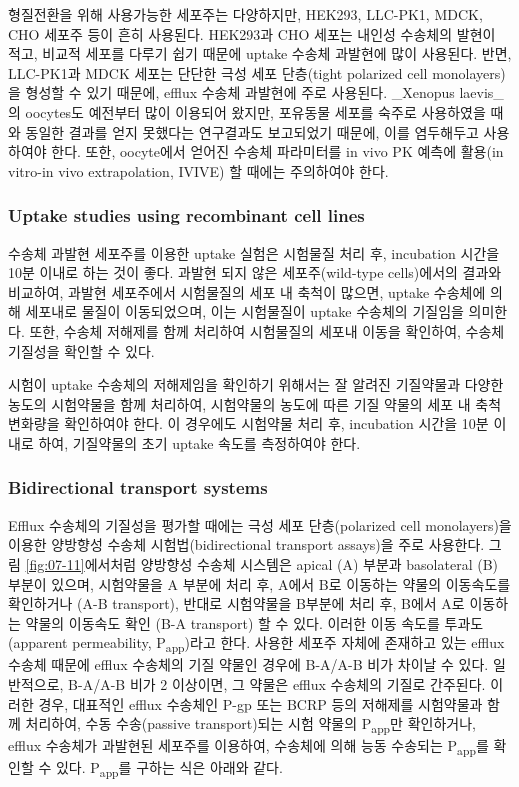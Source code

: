 \documentclass[
  11pt,
  krantz2, a4paper, twoside]{krantz}
\begin{document}
형질전환을 위해 사용가능한 세포주는 다양하지만, HEK293, LLC-PK1, MDCK,
CHO 세포주 등이 흔히 사용된다. HEK293과 CHO 세포는 내인성 수송체의
발현이 적고, 비교적 세포를 다루기 쉽기 때문에 uptake 수송체 과발현에
많이 사용된다. 반면, LLC-PK1과 MDCK 세포는 단단한 극성 세포 단층(tight
polarized cell monolayers)을 형성할 수 있기 때문에, efflux 수송체
과발현에 주로 사용된다. \_Xenopus laevis\_의 oocytes도 예전부터 많이
이용되어 왔지만, 포유동물 세포를 숙주로 사용하였을 때와 동일한 결과를
얻지 못했다는 연구결과도 보고되었기 때문에, 이를 염두해두고 사용하여야
한다. 또한, oocyte에서 얻어진 수송체 파라미터를 in vivo PK 예측에
활용(in vitro-in vivo extrapolation, IVIVE) 할 때에는 주의하여야 한다.

\hypertarget{uptake-studies-using-recombinant-cell-lines}{%
\subsubsection{Uptake studies using recombinant cell lines}\label{uptake-studies-using-recombinant-cell-lines}}

수송체 과발현 세포주를 이용한 uptake 실험은 시험물질 처리 후, incubation
시간을 10분 이내로 하는 것이 좋다. 과발현 되지 않은 세포주(wild-type
cells)에서의 결과와 비교하여, 과발현 세포주에서 시험물질의 세포 내
축척이 많으면, uptake 수송체에 의해 세포내로 물질이 이동되었으며, 이는
시험물질이 uptake 수송체의 기질임을 의미한다. 또한, 수송체 저해제를 함께
처리하여 시험물질의 세포내 이동을 확인하여, 수송체 기질성을 확인할 수
있다.

시험이 uptake 수송체의 저해제임을 확인하기 위해서는 잘 알려진 기질약물과
다양한 농도의 시험약물을 함께 처리하여, 시험약물의 농도에 따른 기질
약물의 세포 내 축척 변화량을 확인하여야 한다. 이 경우에도 시험약물 처리
후, incubation 시간을 10분 이내로 하여, 기질약물의 초기 uptake 속도를
측정하여야 한다.

\hypertarget{bidirectional-transport-systems}{%
\subsubsection{Bidirectional transport systems}\label{bidirectional-transport-systems}}

Efflux 수송체의 기질성을 평가할 때에는 극성 세포 단층(polarized cell
monolayers)을 이용한 양방향성 수송체 시험법(bidirectional transport
assays)을 주로 사용한다. 그림 \ref{fig:07-11}에서처럼 양방향성 수송체
시스템은 apical (A) 부분과 basolateral (B) 부분이 있으며, 시험약물을 A
부분에 처리 후, A에서 B로 이동하는 약물의 이동속도를 확인하거나 (A-B
transport), 반대로 시험약물을 B부분에 처리 후, B에서 A로 이동하는 약물의
이동속도 확인 (B-A transport) 할 수 있다. 이러한 이동 속도를
투과도(apparent permeability, P\textsubscript{app})라고 한다. 사용한 세포주 자체에
존재하고 있는 efflux 수송체 때문에 efflux 수송체의 기질 약물인 경우에
B-A/A-B 비가 차이날 수 있다. 일반적으로, B-A/A-B 비가 2 이상이면, 그
약물은 efflux 수송체의 기질로 간주된다. 이러한 경우, 대표적인 efflux
수송체인 P-gp 또는 BCRP 등의 저해제를 시험약물과 함께 처리하여, 수동
수송(passive transport)되는 시험 약물의 P\textsubscript{app}만 확인하거나, efflux
수송체가 과발현된 세포주를 이용하여, 수송체에 의해 능동 수송되는
P\textsubscript{app}를 확인할 수 있다. P\textsubscript{app}를 구하는 식은 아래와 같다.
\end{document}
